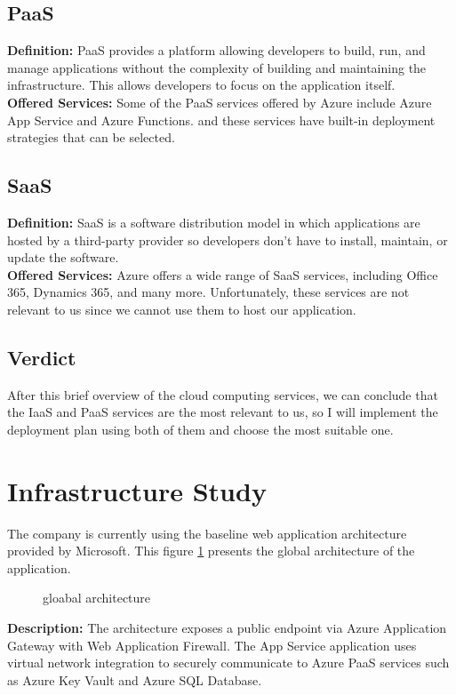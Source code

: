 \subsection*{PaaS}
\noindent
\textbf{Definition:} PaaS provides a platform allowing developers to build, run, and manage applications without the complexity of building and maintaining the infrastructure. This allows developers to focus on the application itself.
\noindent \\
\textbf{Offered Services:} Some of the PaaS services offered by Azure include Azure App Service and Azure Functions. and these services have built-in deployment strategies that can be selected.
\subsection*{SaaS}
\noindent
\textbf{Definition:} SaaS is a software distribution model in which applications are hosted by a third-party provider so developers don't have to install, maintain, or update the software.
\noindent \\
\textbf{Offered Services:} Azure offers a wide range of SaaS services, including Office 365, Dynamics 365, and many more. Unfortunately, these services are not relevant to us since we cannot use them to host our application.
\subsection*{Verdict}
After this brief overview of the cloud computing services, we can conclude that the IaaS and PaaS services are the most relevant to us, so I will implement the deployment plan using both of them and choose the most suitable one.
\section{Infrastructure Study}
The company is currently using the baseline web application architecture provided by Microsoft\cite{webArticle6}.
This figure \ref{fig:gloabal_architecture} presents the global architecture of the application.

\begin{figure}[htpb]
    \centering
    \caption{gloabal architecture}
    \label{fig:gloabal_architecture}
\end{figure}

\noindent \textbf{Description:} The architecture exposes a public endpoint via Azure Application Gateway with Web Application Firewall. The App Service application uses virtual network integration to securely communicate to Azure PaaS services such as Azure Key Vault and Azure SQL Database.

